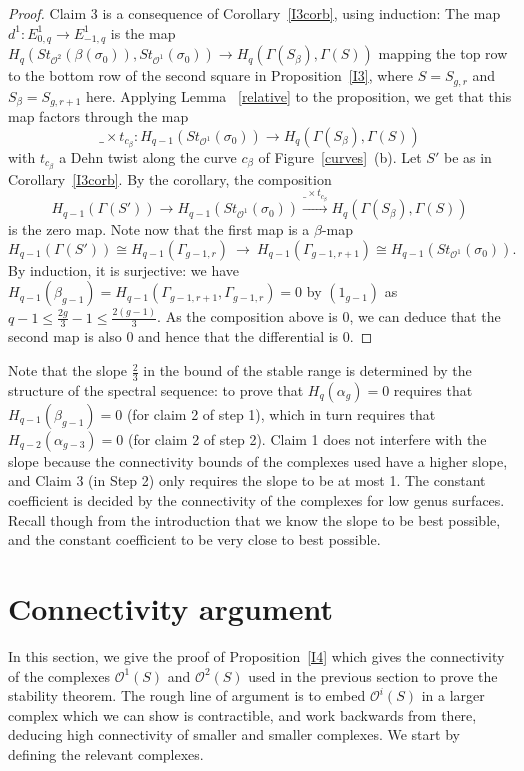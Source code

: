 \documentclass[10pt]{amsart}
\newcommand{\OO}{\mathcal{O}}
\newcommand{\al}{\alpha}
\newcommand{\be}{\beta}
\newcommand{\Ga}{\Gamma}
\newcommand{\s}{\sigma}
\newcommand{\rar}{\longrightarrow}
\begin{document}
\begin{proof}
Claim 3 is a consequence of Corollary~\ref{I3corb},
 using induction: The map $d^1\colon E^1_{0,q}\to E^1_{-1,q}$ is the map 
$H_q(St_{\OO^2}(\be(\s_0)),St_{\OO^1}(\s_0))\to
H_q(\Ga(S_\be),\Ga(S))$ mapping the top row to the
bottom row of the second square in Proposition~\ref{I3}, where $S=S_{g,r}$ and
$S_\be=S_{g,r+1}$ here. Applying Lemma ~\ref{relative} to the proposition,
we get that this map 
factors through the map 
$$\_ \times t_{c_\be} \colon H_{q-1}(St_{\OO^1}(\s_0))\rar
H_q(\Ga(S_\be),\Ga(S))$$
with $t_{c_\be}$ a Dehn twist along the curve $c_\be$ of Figure~\ref{curves}~(b). 
Let $S'$ be as in Corollary~\ref{I3corb}. By the corollary, the
composition  
$$H_{q-1}(\Ga(S'))\rar 
H_{q-1}(St_{\OO^1}(\s_0))\xrightarrow{\_ \times t_{c_\be}} H_q(\Ga(S_\be),\Ga(S))$$
is the zero map. Note now that the first map is a $\be$-map
$$ H_{q-1}(\Ga(S'))\cong H_{q-1}(\Ga_{g-1,r})\ \rar\ H_{q-1}(\Ga_{g-1,r+1})
\cong H_{q-1}(St_{\OO^1}(\s_0)).$$
By induction, it is surjective: we have
$H_{q-1}(\be_{g-1}) = H_{q-1}(\Ga_{g-1,r+1},\Ga_{g-1,r})=0$ by $(1_{g-1})$ as $q-1\le
\frac{2g}{3}-1\le\frac{2(g-1)}{3}$.
As the composition above is 0, we can deduce that the second map is
also 0 and hence that the differential is 0.  
\end{proof}



Note that the slope $\frac{2}{3}$ in the bound of the stable range is
determined by the structure of the spectral sequence: to prove that 
$H_q(\al_g)=0$ requires that $H_{q-1}(\beta_{g-1})=0$ (for claim 2 of step 1),
which in turn requires that $H_{q-2}(\al_{g-3})=0$ (for claim 2 of step 2).   
Claim 1 does not interfere with the slope because the connectivity
bounds of the complexes used have a higher
slope, and Claim 3 (in Step 2) only requires the slope to be at most 1.
The constant
coefficient is decided by the connectivity of the complexes
for low genus surfaces. Recall though from the introduction that we know the slope to be best
possible, and the constant coefficient to be very close to best possible. 









\section{Connectivity argument}\label{connectivity}

In this section, we give the proof of Proposition~\ref{I4} which gives the connectivity of the complexes $\OO^1(S)$ and $\OO^2(S)$ 
used in the previous section to prove the stability theorem.
The rough line of argument is to embed $\OO^i(S)$ in a larger complex which we can show is contractible, and work backwards from there,
deducing high connectivity of smaller and smaller complexes. 
We start by defining the relevant complexes. 
\end{document}
